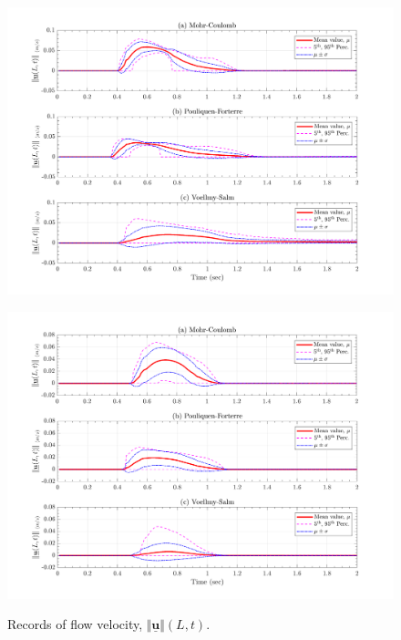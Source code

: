 \documentclass{article}
\begin{document}
\begin{figure}[H]
	\begin{minipage}[b]{0.5\linewidth}
    	\centering
    	\includegraphics[width=1\textwidth]{InclinedPlane/LocalRecords/Records/Vel_L3.png}
    	\label{fig:Ramp-L3-Vel}
	\end{minipage}
	\begin{minipage}[b]{0.5\linewidth}
		\centering
		\includegraphics[width=1\textwidth]{InclinedPlane/LocalRecords/Records/Vel_L4.png}
    	\label{fig:Ramp-L4-Vel}
    \end{minipage}
    \caption{Records of flow velocity, $\Vert \underline{\mathbf{u}} \Vert(L,t)$.}
    \label{fig:Ramp-LM-Vel}
\end{figure}
\end{document}
